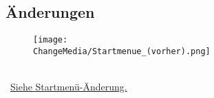 %



\newpage





\subsection*{Änderungen}


	\begin{figure}[ht]
	
		\label{Abb:Aenderungen:Startmenue_(vorher)}
		\centering

		\texttt{[image: \\ChangeMedia/Startmenue\_(vorher).png]}

	\end{figure}
	
~\\\mousecursor~\hyperref[Abschnitt:Aenderungen:Protokoll:Startmenue]{Siehe Startmenü-Änderung.} 


